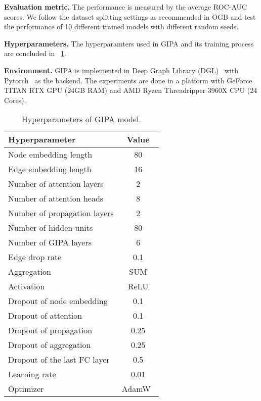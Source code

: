 \documentclass[sigconf]{acmart}
\newcommand{\model}{GIPA\xspace}
\begin{document}
\noindent \textbf{Evaluation metric.} The performance is measured by the average ROC-AUC scores. We follow the dataset splitting settings as recommended in OGB and test the performance of 10 different trained models with different random seeds. 

\noindent \textbf{Hyperparameters.} The hyperparamters used in \model and its training process are concluded in \tablename~\ref{tab:hyper}.

\noindent \textbf{Environment.} \model is implemented in Deep Graph Library (DGL)~\cite{wang2019deep} with Pytorch~\cite{paszke2019pytorch} as the backend. The experiments are done in a platform with GeForce TITAN RTX GPU (24GB RAM) and AMD Ryzen Threadripper 3960X CPU (24 Cores).

\begin{table}[t]
\caption{Hyperparameters of \model model.}
\begin{tabular}{lc}
\hline
\textbf{Hyperparameter}      & \textbf{Value} \\ \hline
Node embedding length        & 80             \\ 
Edge embedding length        & 16             \\ 
Number of attention layers   & 2              \\ 
Number of attention heads    & 8              \\ 
Number of propagation layers & 2              \\ 
Number of hidden units       & 80             \\ 
Number of GIPA layers        & 6              \\ 
Edge drop rate               & 0.1            \\ 
Aggregation                  & SUM            \\ 
Activation                   & ReLU           \\
Dropout of node embedding    & 0.1            \\
Dropout of attention         & 0.1            \\ 
Dropout of propagation       & 0.25           \\ 
Dropout of aggregation       & 0.25           \\ 
Dropout of the last FC layer & 0.5            \\ 
Learning rate & 0.01            \\ 
Optimizer & AdamW~\cite{loshchilov2017decoupled}  \\ \hline
\end{tabular}
\label{tab:hyper}
\end{table}
\end{document}
